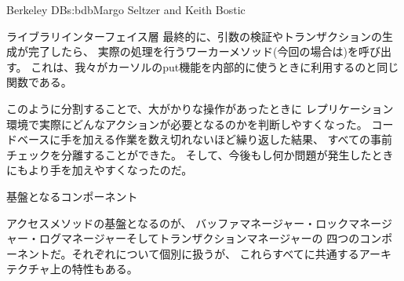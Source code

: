 \begin{aosachapter}{Berkeley DB}{s:bdb}{Margo Seltzer and Keith Bostic}
\begin{aosasect1}{ライブラリインターフェイス層}
最終的に、引数の検証やトランザクションの生成が完了したら、
実際の処理を行うワーカーメソッド(今回の場合は)を呼び出す。
これは、我々がカーソルのput機能を内部的に使うときに利用するのと同じ関数である。

このように分割することで、大がかりな操作があったときに
レプリケーション環境で実際にどんなアクションが必要となるのかを判断しやすくなった。
コードベースに手を加える作業を数え切れないほど繰り返した結果、
すべての事前チェックを分離することができた。
そして、今後もし何か問題が発生したときにもより手を加えやすくなったのだ。

\end{aosasect1}

\begin{aosasect1}{基盤となるコンポーネント}

アクセスメソッドの基盤となるのが、
バッファマネージャー・ロックマネージャー・ログマネージャーそしてトランザクションマネージャーの
四つのコンポーネントだ。それぞれについて個別に扱うが、
これらすべてに共通するアーキテクチャ上の特性もある。


\end{aosasect1}
\end{aosachapter}
